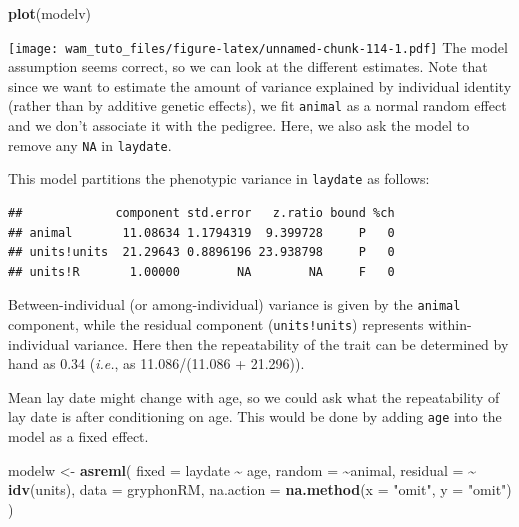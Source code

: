 \documentclass[
  12pt,
]{book}
\newenvironment{Shaded}{\begin{snugshade}}{\end{snugshade}}
\newcommand{\DataTypeTok}[1]{\textcolor[rgb]{0.13,0.29,0.53}{#1}}
\newcommand{\KeywordTok}[1]{\textcolor[rgb]{0.13,0.29,0.53}{\textbf{#1}}}
\newcommand{\NormalTok}[1]{#1}
\newcommand{\OperatorTok}[1]{\textcolor[rgb]{0.81,0.36,0.00}{\textbf{#1}}}
\newcommand{\StringTok}[1]{\textcolor[rgb]{0.31,0.60,0.02}{#1}}
\begin{document}
\begin{Shaded}
\begin{Highlighting}[]
\KeywordTok{plot}\NormalTok{(modelv)}
\end{Highlighting}
\end{Shaded}

\texttt{[image: wam\_tuto\_files/figure-latex/unnamed-chunk-114-1.pdf]}
The model assumption seems correct, so we can look at the different estimates.
Note that since we want to estimate the amount of variance explained by individual identity (rather than by additive genetic effects), we fit \texttt{animal} as a normal random effect and we don't associate it with the pedigree.
Here, we also ask the model to remove any \texttt{NA} in \texttt{laydate}.

This model partitions the phenotypic variance in \texttt{laydate} as follows:

\begin{Shaded}
\end{Shaded}

\begin{verbatim}
##             component std.error   z.ratio bound %ch
## animal       11.08634 1.1794319  9.399728     P   0
## units!units  21.29643 0.8896196 23.938798     P   0
## units!R       1.00000        NA        NA     F   0
\end{verbatim}

Between-individual (or among-individual) variance is given by the \texttt{animal} component, while the residual component (\texttt{units!units}) represents within-individual variance. Here then the repeatability of the trait can be determined by hand as 0.34 (\emph{i.e.}, as 11.086/(11.086 + 21.296)).

Mean lay date might change with age, so we could ask what the repeatability of lay date is after conditioning on age. This would be done by adding \texttt{age} into the model as a fixed effect.

\begin{Shaded}
\begin{Highlighting}[]
\NormalTok{modelw \textless{}{-}}\StringTok{ }\KeywordTok{asreml}\NormalTok{(}
  \DataTypeTok{fixed =}\NormalTok{ laydate }\OperatorTok{\textasciitilde{}}\StringTok{ }\NormalTok{age,}
  \DataTypeTok{random =} \OperatorTok{\textasciitilde{}}\NormalTok{animal,}
  \DataTypeTok{residual =} \OperatorTok{\textasciitilde{}}\StringTok{ }\KeywordTok{idv}\NormalTok{(units),}
  \DataTypeTok{data =}\NormalTok{ gryphonRM,}
  \DataTypeTok{na.action =} \KeywordTok{na.method}\NormalTok{(}\DataTypeTok{x =} \StringTok{"omit"}\NormalTok{, }\DataTypeTok{y =} \StringTok{"omit"}\NormalTok{)}
\NormalTok{)}
\end{Highlighting}
\end{Shaded}
\end{document}
